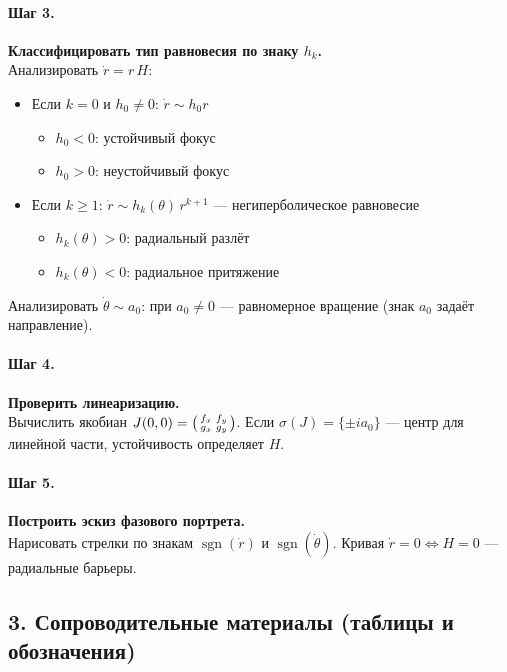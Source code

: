 \paragraph{Шаг 3.} \textbf{Классифицировать тип равновесия по знаку \(h_k\).}\\
Анализировать \(\dot r=r\,H\):
\begin{itemize}
\item Если \(k=0\) и \(h_0\neq 0\): \(\dot r\sim h_0 r\)
  \begin{itemize}
  \item \(h_0<0\): устойчивый фокус
  \item \(h_0>0\): неустойчивый фокус
  \end{itemize}
\item Если \(k\ge 1\): \(\dot r\sim h_k(\theta)\,r^{k+1}\) — негиперболическое равновесие
  \begin{itemize}
  \item \(h_k(\theta)>0\): радиальный разлёт
  \item \(h_k(\theta)<0\): радиальное притяжение
  \end{itemize}
\end{itemize}
Анализировать \(\dot\theta \sim a_0\): при \(a_0\neq 0\) — равномерное вращение (знак \(a_0\) задаёт направление).

\paragraph{Шаг 4.} \textbf{Проверить линеаризацию.}\\
Вычислить якобиан \(J(0,0)=\begin{psmallmatrix}f_x&f_y\\ g_x&g_y\end{psmallmatrix}\).
Если \(\sigma(J)=\{\pm i a_0\}\) — центр для линейной части, устойчивость определяет \(H\).

\paragraph{Шаг 5.} \textbf{Построить эскиз фазового портрета.}\\
Нарисовать стрелки по знакам \(\operatorname{sgn}(\dot r)\) и \(\operatorname{sgn}(\dot\theta)\).
Кривая \(\dot r=0\Leftrightarrow H=0\) — радиальные барьеры.

\subsection*{3. Сопроводительные материалы (таблицы и обозначения)}

